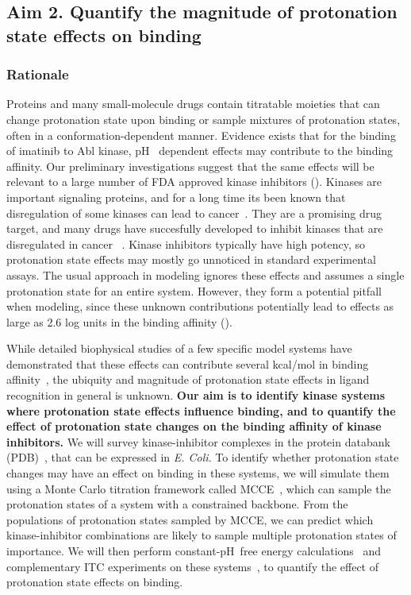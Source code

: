 \documentclass[10pt,final]{article}
\newcommand{\pH}{p$\mathrm{H}$\ }
\begin{document}
\subsection*{Aim 2. Quantify the magnitude of protonation state effects on binding}
\subsubsection*{Rationale}
Proteins and many small-molecule drugs contain titratable moieties that can change protonation state upon binding or sample mixtures of protonation states, often in a conformation-dependent manner.
%
Evidence exists that for the binding of imatinib to Abl kinase, \pH{} dependent effects may contribute to the binding affinity\cite{Szakacs2005a, Seeliger2007a, Lin2013a}. 
%
Our preliminary investigations suggest that the same effects will be relevant to a large number of FDA approved kinase inhibitors ().
%
Kinases are important signaling proteins, and for a long time its been known that disregulation of some kinases can lead to cancer~\autocite{Levinson1978a,Vivanco2002a}.
%
They are a promising drug target, and many drugs have succesfully developed to inhibit kinases that are disregulated in cancer ~\autocite{Baselga2006a,Garber2006a,OHare2011a}.
%
Kinase inhibitors typically have high potency, so protonation state effects may mostly go unnoticed in standard experimental assays.
%
The usual approach in modeling ignores these effects and assumes a single protonation state for an entire system.
%
However, they form a potential pitfall when modeling, since these unknown contributions potentially lead to effects as large as 2.6 log units in the binding affinity ().

While detailed biophysical studies of a few specific model systems have demonstrated that these effects can contribute several kcal/mol in binding affinity~\autocite{Dullweber2001a,Aleksandrov2007a,Czodrowski2007a,Steuber2007a,Czodrowski2007b},
the ubiquity and magnitude of protonation state effects in ligand recognition in general is unknown.
%
\textbf{Our aim is to identify kinase systems where protonation state effects influence binding, and to quantify the effect of protonation state changes on the binding affinity of kinase inhibitors.}
%
We will survey kinase-inhibitor complexes in the protein databank (PDB)~\autocite{Berman2000a}, that can be expressed in \textit{E. Coli}.
%
To identify whether protonation state changes may have an effect on binding in these systems, we will simulate them using a Monte Carlo titration framework called MCCE~\autocite{Song2009a}, which can sample the protonation states of a system with a constrained backbone.
%
From the populations of protonation states sampled by MCCE, we can predict which kinase-inhibitor combinations are likely to sample multiple protonation states of importance.
%
We will then perform constant-\pH free energy calculations~\autocite{Mongan2004a,Stern2007a,Nilmeier2011a} and complementary ITC experiments on these systems~\autocite{Baker1996a,Neeb2014a}, to quantify the effect of protonation state effects on binding.
%
\end{document}

